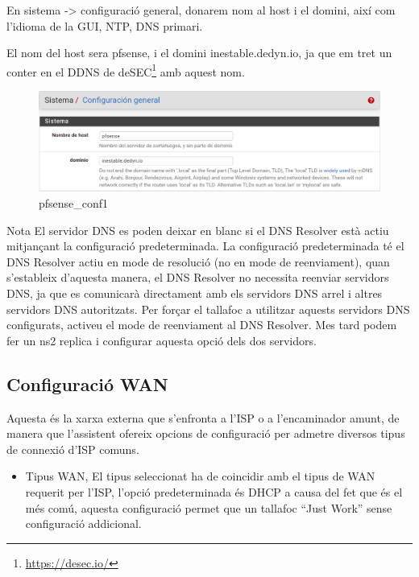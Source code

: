 \documentclass[
  10pt,
]{krantz}
\DeclareRobustCommand{\href}[2]{#2\footnote{\url{#1}}}
\providecommand{\tightlist}{%
  \setlength{\itemsep}{0pt}\setlength{\parskip}{0pt}}
\begin{document}
En sistema -\textgreater{} configuració general, donarem nom al host i el domini, així com l'idioma de la GUI, NTP, DNS primari.

El nom del host sera pfsense, i el domini inestable.dedyn.io, ja que em tret un conter en el DDNS de \href{https://desec.io/}{deSEC} amb aquest nom.

\begin{figure}
\centering
\includegraphics{imatges/pfsense_conf1.png}
\caption{pfsense\_conf1}
\end{figure}

\begin{rmdinfo}{Nota}
El servidor DNS es poden deixar en blanc si el DNS Resolver està actiu mitjançant la configuració predeterminada. La configuració predeterminada té el DNS Resolver actiu en mode de resolució (no en mode de reenviament), quan s'estableix d'aquesta manera, el DNS Resolver no necessita reenviar servidors DNS, ja que es comunicarà directament amb els servidors DNS arrel i altres servidors DNS autoritzats. Per forçar el tallafoc a utilitzar aquests servidors DNS configurats, activeu el mode de reenviament al DNS Resolver. Mes tard podem fer un ns2 replica i configurar aquesta opció dels dos servidors.

\end{rmdinfo}

\hypertarget{configuraciuxf3-wan}{%
\subsection{Configuració WAN}\label{configuraciuxf3-wan}}

Aquesta és la xarxa externa que s'enfronta a l'ISP o a l'encaminador amunt, de manera que l'assistent ofereix opcions de configuració per admetre diversos tipus de connexió d'ISP comuns.

\begin{itemize}
\tightlist
\item
  Tipus WAN, El tipus seleccionat ha de coincidir amb el tipus de WAN requerit per l'ISP, l'opció predeterminada és DHCP a causa del fet que és el més comú, aquesta configuració permet que un tallafoc ``Just Work'' sense configuració addicional.
\end{itemize}
\end{document}

